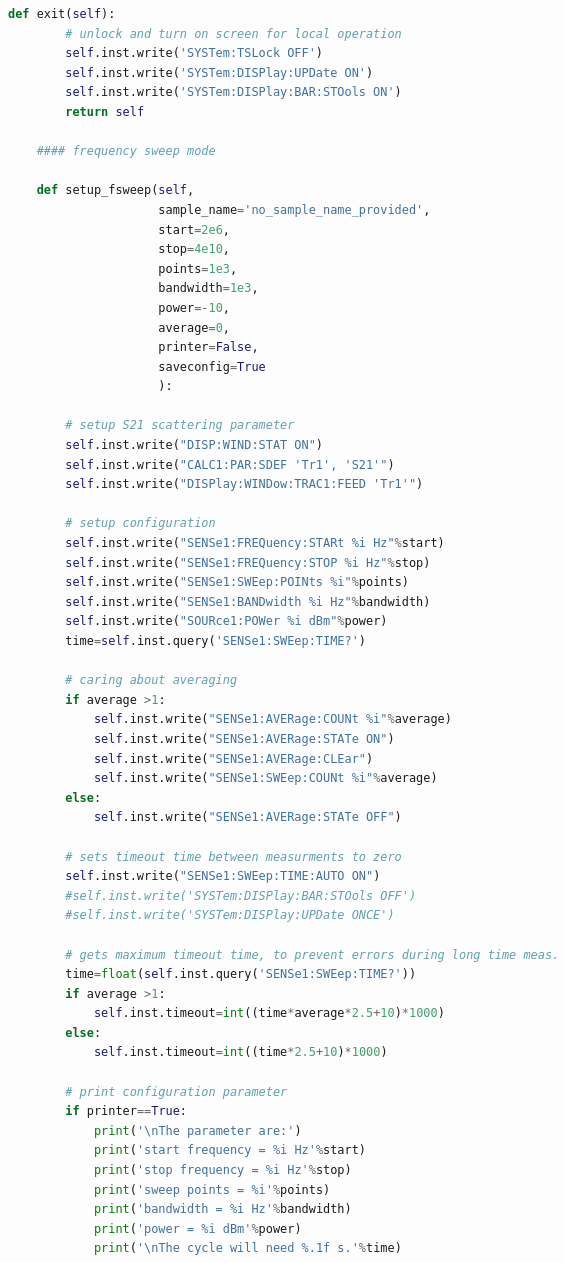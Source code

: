 \begin{landscape}
\begin{multicols}{2}
\begin{lstlisting}[language=Python]
    def exit(self):
        # unlock and turn on screen for local operation
        self.inst.write('SYSTem:TSLock OFF')
        self.inst.write('SYSTem:DISPlay:UPDate ON')
        self.inst.write('SYSTem:DISPlay:BAR:STOols ON')
        return self
        
    #### frequency sweep mode
    
    def setup_fsweep(self,
                     sample_name='no_sample_name_provided',
                     start=2e6,
                     stop=4e10,
                     points=1e3,
                     bandwidth=1e3,
                     power=-10,
                     average=0,
                     printer=False,
                     saveconfig=True
                     ):
        
        # setup S21 scattering parameter
        self.inst.write("DISP:WIND:STAT ON")
        self.inst.write("CALC1:PAR:SDEF 'Tr1', 'S21'")
        self.inst.write("DISPlay:WINDow:TRAC1:FEED 'Tr1'")
        
        # setup configuration
        self.inst.write("SENSe1:FREQuency:STARt %i Hz"%start)
        self.inst.write("SENSe1:FREQuency:STOP %i Hz"%stop)
        self.inst.write("SENSe1:SWEep:POINts %i"%points)
        self.inst.write("SENSe1:BANDwidth %i Hz"%bandwidth)
        self.inst.write("SOURce1:POWer %i dBm"%power)
        time=self.inst.query('SENSe1:SWEep:TIME?')
        
        # caring about averaging
        if average >1:
            self.inst.write("SENSe1:AVERage:COUNt %i"%average)
            self.inst.write("SENSe1:AVERage:STATe ON")
            self.inst.write("SENSe1:AVERage:CLEar")
            self.inst.write("SENSe1:SWEep:COUNt %i"%average)
        else:
            self.inst.write("SENSe1:AVERage:STATe OFF")
        
        # sets timeout time between measurments to zero
        self.inst.write("SENSe1:SWEep:TIME:AUTO ON")
        #self.inst.write('SYSTem:DISPlay:BAR:STOols OFF')
        #self.inst.write('SYSTem:DISPlay:UPDate ONCE')
        
        # gets maximum timeout time, to prevent errors during long time meas.
        time=float(self.inst.query('SENSe1:SWEep:TIME?'))
        if average >1:
            self.inst.timeout=int((time*average*2.5+10)*1000)
        else:
            self.inst.timeout=int((time*2.5+10)*1000)
            
        # print configuration parameter
        if printer==True:
            print('\nThe parameter are:')
            print('start frequency = %i Hz'%start)
            print('stop frequency = %i Hz'%stop)
            print('sweep points = %i'%points)
            print('bandwidth = %i Hz'%bandwidth)
            print('power = %i dBm'%power)
            print('\nThe cycle will need %.1f s.'%time)
              

\end{lstlisting}
\end{multicols}
\end{landscape}
